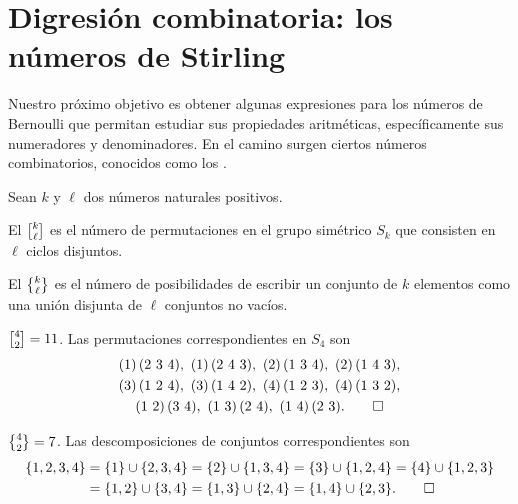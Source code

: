 \documentclass{article}
\numberwithin{equation}{section}
\theoremstyle{definition}
\begin{document}

\section{Digresión combinatoria: los números de Stirling}
\label{section:numeros-de-stirling}

Nuestro próximo objetivo es obtener algunas expresiones para los números de
Bernoulli que permitan estudiar sus propiedades aritméticas, específicamente sus
numeradores y denominadores. En el camino surgen ciertos números combinatorios,
conocidos como los .

\begin{definicion}
  \label{def:numeros-de-stirling-N}
  Sean $k$ y $\ell$ dos números naturales positivos.

  El  $\stirling{k}{\ell}$ es el número
  de permutaciones en el grupo simétrico $S_k$ que consisten en $\ell$ ciclos
  disjuntos.

  El  $\Stirling{k}{\ell}$ es
  el número de posibilidades de escribir un conjunto de $k$ elementos como una
  unión disjunta de $\ell$ conjuntos no vacíos.
\end{definicion}

\begin{ejemplo}
  $\stirling{4}{2} = 11$. Las permutaciones correspondientes en $S_4$ son
  \begin{gather*}
    (1)\,(2~3~4), ~ (1)\,(2~4~3), ~ (2)\,(1~3~4), ~ (2)\,(1~4~3),\\
    (3)\,(1~2~4), ~ (3)\,(1~4~2), ~ (4)\,(1~2~3), ~ (4)\,(1~3~2),\\
    (1~2)\,(3~4), ~ (1~3)\,(2~4), ~ (1~4)\,(2~3). \qedhere
  \end{gather*}
\end{ejemplo}

\begin{ejemplo}
  $\Stirling{4}{2} = 7$. Las descomposiciones de conjuntos correspondientes son
  \begin{align*}
    \{ 1,2,3,4 \} & = \{ 1 \} \cup \{ 2,3,4 \} = \{ 2 \} \cup \{ 1,3,4 \} = \{ 3 \} \cup \{ 1,2,4 \} = \{ 4 \} \cup \{ 1,2,3 \} \\
                  & = \{ 1,2 \} \cup \{ 3,4 \} = \{ 1,3 \} \cup \{ 2,4 \} = \{ 1,4 \} \cup \{ 2,3 \}. \qedhere
  \end{align*}
\end{ejemplo}
\end{document}
